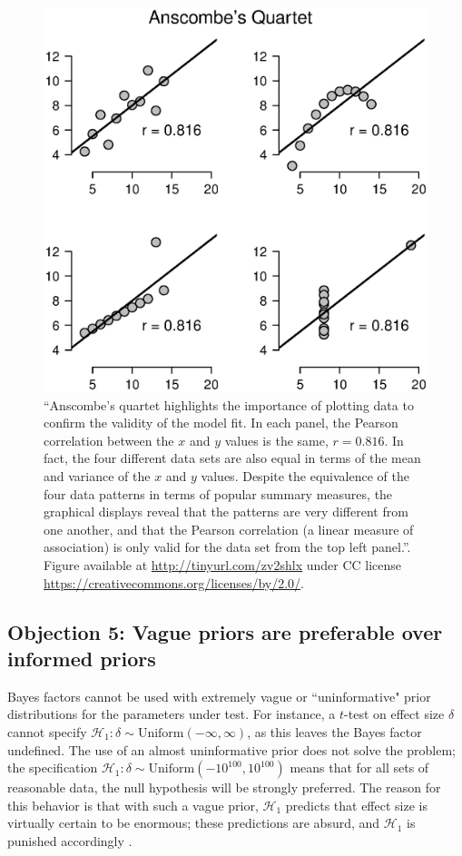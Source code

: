 \begin{figure}[!t]
    \begin{center}
        \includegraphics[width=.8\textwidth]{figs/bi1_AnscombesQuartet.eps}
        \caption{``Anscombe's quartet highlights the importance of plotting data to confirm the validity of the model fit. In each panel, the Pearson correlation between the $x$ and $y$ values is the same, $r = 0.816$. In fact, the four different data sets are also equal in terms of the mean and variance of the $x$ and $y$ values. Despite the equivalence of the four data patterns in terms of popular summary measures, the graphical displays reveal that the patterns are very different from one another, and that the Pearson correlation (a linear measure of association) is only valid for the data set from the top left panel.''\protect \cite[p. 34]{HeathcoteEtAl2015}. Figure available at \protect \url{http://tinyurl.com/zv2shlx} under CC license \protect \url{https://creativecommons.org/licenses/by/2.0/}.}\label{fig:bi1:AnscombesQuartet}
    \end{center}
\end{figure}

\subsection{Objection 5: Vague priors are preferable over informed priors}
Bayes factors cannot be used with extremely vague or ``uninformative" prior distributions for the parameters under test. For instance, a $t$-test on effect size $\delta$ cannot specify $\mathcal{H}_1: \delta \sim \text{Uniform}(-\infty, \infty)$, as this leaves the Bayes factor undefined. The use of an almost uninformative prior does not solve the problem; the specification $\mathcal{H}_1: \delta \sim \text{Uniform}(-10^{100}, 10^{100})$ means that for all sets of reasonable data, the null hypothesis will be strongly preferred. The reason for this behavior is that with such a vague prior, $\mathcal{H}_1$ predicts that effect size is virtually certain to be enormous; these predictions are absurd, and $\mathcal{H}_1$ is punished accordingly \cite{RouderMorey2012Regression}.

